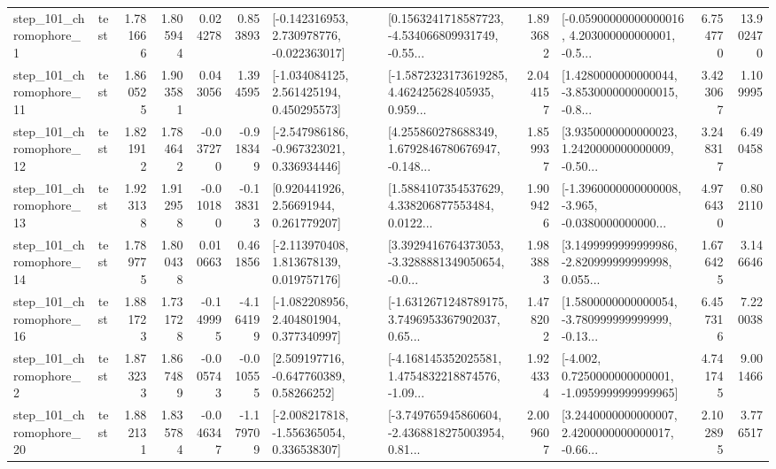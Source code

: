 \begin{tabular}{llrrrrllrlrr}
   step\_101\_chromophore\_1 &      test &      1.781666 &    1.805944 &      0.024278 &  0.853893 &   [-0.142316953, 2.730978776, -0.022363017] &  [0.1563241718587723, -4.534066809931749, -0.55... &       1.893682 &  [-0.05900000000000016, 4.203000000000001, -0.5... &            6.754770 &         13.902470 \\
  step\_101\_chromophore\_11 &      test &      1.860525 &    1.903581 &      0.043056 &  1.394595 &    [-1.034084125, 2.561425194, 0.450295573] &  [-1.5872323173619285, 4.462425628405935, 0.959... &       2.044157 &  [1.4280000000000044, -3.8530000000000015, -0.8... &            3.423067 &          1.109995 \\
  step\_101\_chromophore\_12 &      test &      1.821912 &    1.784642 &     -0.037270 & -0.918349 &   [-2.547986186, -0.967323021, 0.336934446] &  [4.255860278688349, 1.6792846780676947, -0.148... &       1.859937 &  [3.9350000000000023, 1.2420000000000009, -0.50... &            3.248317 &          6.490458 \\
  step\_101\_chromophore\_13 &      test &      1.923138 &    1.912958 &     -0.010180 & -0.138313 &      [0.920441926, 2.56691944, 0.261779207] &  [1.5884107354537629, 4.338206877553484, 0.0122... &       1.909426 &  [-1.3960000000000008, -3.965, -0.0380000000000... &            4.976430 &          0.802110 \\
  step\_101\_chromophore\_14 &      test &      1.789775 &    1.800438 &      0.010663 &  0.461856 &    [-2.113970408, 1.813678139, 0.019757176] &  [3.3929416764373053, -3.3288881349050654, -0.0... &       1.983883 &  [3.1499999999999986, -2.820999999999998, 0.055... &            1.676425 &          3.146646 \\
  step\_101\_chromophore\_16 &      test &      1.881723 &    1.731728 &     -0.149995 & -4.164199 &    [-1.082208956, 2.404801904, 0.377340997] &  [-1.6312671248789175, 3.7496953367902037, 0.65... &       1.478202 &  [1.5800000000000054, -3.780999999999999, -0.13... &            6.457316 &          7.220038 \\
   step\_101\_chromophore\_2 &      test &      1.873233 &    1.867489 &     -0.005743 & -0.010555 &     [2.509197716, -0.647760389, 0.58266252] &  [-4.168145352025581, 1.4754832218874576, -1.09... &       1.924334 &  [-4.002, 0.7250000000000001, -1.0959999999999965] &            4.741745 &          9.001466 \\
  step\_101\_chromophore\_20 &      test &      1.882131 &    1.835784 &     -0.046347 & -1.179709 &   [-2.008217818, -1.556365054, 0.336538307] &  [-3.749765945860604, -2.4368818275003954, 0.81... &       2.009607 &  [3.2440000000000007, 2.4200000000000017, -0.66... &            2.102895 &          3.776517 \\

\end{tabular}
